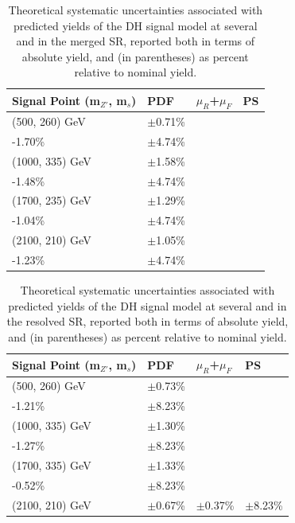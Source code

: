 \begin{table}[ht]
\begin{center}\small{
\caption{\label{tab:systs_sig_SR_mgd} Theoretical systematic uncertainties associated with predicted yields of the DH signal model at several \ms and \mZp in the merged SR, reported both in terms of absolute yield, and (in parentheses) as percent relative to nominal yield.}
\begin{tabular}{l l l l }
\toprule
\textbf{Signal Point (m\({_{Z'}}\), m\(_s\))} &\textbf{PDF} &\textbf{\(\mu_R\)+\(\mu_F\)} &\textbf{PS}\tabularnewline
\midrule
\midrule
(500, 260) GeV & \(\pm\)0.71\% & \(\substack{+1.76\%\\-1.70\%}\) & \(\pm\)4.74\% \tabularnewline
\midrule
(1000, 335) GeV & \(\pm\)1.58\% & \(\substack{+1.64\%\\-1.48\%}\) & \(\pm\)4.74\% \tabularnewline
\midrule
(1700, 235) GeV & \(\pm\)1.29\% & \(\substack{+0.98\%\\-1.04\%}\) & \(\pm\)4.74\% \tabularnewline
\midrule
(2100, 210) GeV & \(\pm\)1.05\% & \(\substack{+1.13\%\\-1.23\%}\) & \(\pm\)4.74\% \tabularnewline
\bottomrule
\end{tabular}
}
\end{center}
\end{table}

\begin{table}[ht]
\begin{center}\small{
\caption{\label{tab:systs_sig_SR_res} Theoretical systematic uncertainties associated with predicted yields of the DH signal model at several \ms and \mZp in the resolved SR, reported both in terms of absolute yield, and (in parentheses) as percent relative to nominal yield.}
\begin{tabular}{l l l l }
\toprule
\textbf{Signal Point (m\({_{Z'}}\), m\(_s\))} &\textbf{PDF} &\textbf{\(\mu_R\)+\(\mu_F\)} &\textbf{PS}\tabularnewline
\midrule
\midrule
(500, 260) GeV & \(\pm\)0.73\% & \(\substack{+1.35\%\\-1.21\%}\) & \(\pm\)8.23\% \tabularnewline
\midrule
(1000, 335) GeV & \(\pm\)1.30\% & \(\substack{+1.40\%\\-1.27\%}\) & \(\pm\)8.23\% \tabularnewline
\midrule
(1700, 335) GeV & \(\pm\)1.33\% & \(\substack{+0.49\%\\-0.52\%}\) & \(\pm\)8.23\% \tabularnewline
\midrule
(2100, 210) GeV & \(\pm\)0.67\% & \(\pm\)0.37\% & \(\pm\)8.23\% \tabularnewline
\bottomrule
\end{tabular}
}
\end{center}
\end{table}


